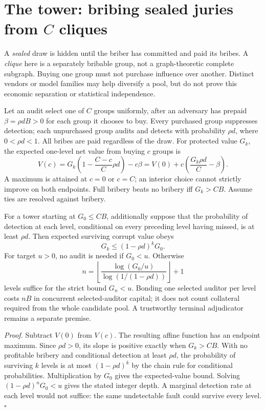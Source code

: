 \documentclass[11pt,a4paper]{article}
\begin{document}


\section{The tower: bribing sealed juries from $C$ cliques}\label{sec:tower}
A \emph{sealed} draw is hidden until the briber has committed and paid its bribes. A \emph{clique} here is a separately bribable group, not a graph-theoretic complete subgraph. Buying one group must not purchase influence over another. Distinct vendors or model families may help diversify a pool, but do not prove this economic separation or statistical independence.

\begin{thebox}
\begin{theorem}\label{thm:tower}
Let an audit select one of $C$ groups uniformly, after an adversary has prepaid $\beta=\rho dB>0$ for each group it chooses to buy. Every purchased group suppresses detection; each unpurchased group audits and detects with probability $\rho d$, where $0<\rho d<1$. All bribes are paid regardless of the draw. For protected value $G_k$, the expected one-level net value from buying $c$ groups is
\[
 V(c)=G_k\left(1-\frac{C-c}{C}\rho d\right)-c\beta
     =V(0)+c\left(\frac{G_k\rho d}{C}-\beta\right).
\]
A maximum is attained at $c=0$ or $c=C$; an interior choice cannot strictly improve on both endpoints. Full bribery beats no bribery iff $G_k>CB$. Assume ties are resolved against bribery.

For a tower starting at $G_0\le CB$, additionally suppose that the probability of detection at each level, conditional on every preceding level having missed, is at least $\rho d$. Then expected surviving corrupt value obeys
\[G_k\le (1-\rho d)^kG_0.\]
For target $u>0$, no audit is needed if $G_0<u$. Otherwise
\[
 n=\left\lfloor\frac{\log(G_0/u)}{\log(1/(1-\rho d))}\right\rfloor+1
\]
levels suffice for the strict bound $G_n<u$. Bonding one selected auditor per level costs $nB$ in concurrent selected-auditor capital; it does not count collateral required from the whole candidate pool. A trustworthy terminal adjudicator remains a separate premise.
\end{theorem}
\end{thebox}

\emph{Proof.} Subtract $V(0)$ from $V(c)$. The resulting affine function has an endpoint maximum. Since $\rho d>0$, its slope is positive exactly when $G_k>CB$. With no profitable bribery and conditional detection at least $\rho d$, the probability of surviving $k$ levels is at most $(1-\rho d)^k$ by the chain rule for conditional probabilities. Multiplication by $G_0$ gives the expected-value bound. Solving $(1-\rho d)^nG_0<u$ gives the stated integer depth. A marginal detection rate at each level would not suffice: the same undetectable fault could survive every level. \hfill$\square$
\end{document}
